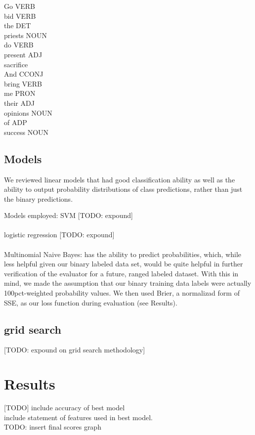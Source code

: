 \documentclass[letterpaper, 10 pt, conference]{ieeeconf}  %
\begin{document}
Go VERB  \\  
bid VERB  \\ 
the DET   \\
priests NOUN \\
do  VERB   \\
present ADJ  \\
sacrifice\\
And CCONJ \\
bring VERB  \\
me  PRON   \\
their ADJ    \\
opinions  NOUN  \\
of  ADP    \\
success NOUN \\


\subsection{Models}
We reviewed linear models that had good classification ability as well as the ability to output probability distributions of class predictions, rather than just the binary predictions.


Models employed:
SVM [TODO: expound]\\ \\
logistic regression [TODO: expound]\\ \\
Multinomial Naive Bayes:
  has the ability to predict probabilities, which, while less helpful given our binary labeled data set, would be quite helpful in further verification of the evaluator for a future, ranged labeled dataset. With this in mind, we made the assumption that our binary training data labels were actually 100pct-weighted probability values. We then used Brier, a normalizad form of SSE, as our loss function during evaluation (see Results).


  \subsection{grid search}
    [TODO: expound on grid search methodology]

  \section{Results}
    [TODO]
    include accuracy of best model\\
    include statement of features used in best model.\\
    TODO: insert final scores graph
\end{document}
